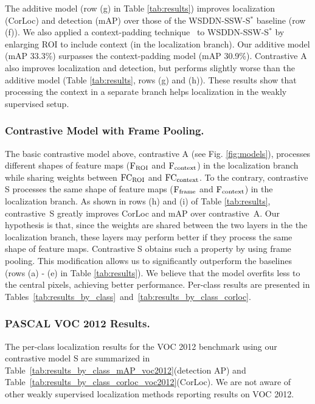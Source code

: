 The additive model (row (g) in Table \ref{tab:results}) improves localization (CorLoc) and detection (mAP)  over those of  the WSDDN-SSW-S$^*$ baseline (row (f)). We also applied a context-padding technique~\cite{Girshick:2016ig} to WSDDN-SSW-S$^*$ by enlarging ROI to include context (in the localization branch). Our additive model (mAP 33.3\%) surpasses the context-padding model (mAP 30.9\%).
Contrastive A also improves localization and detection, but performs slightly worse than the additive model (Table \ref{tab:results}, rows (g) and (h)). 
These results show that processing the context in a separate branch helps 
localization in the weakly supervised setup.


\subsubsection{Contrastive Model with Frame Pooling.}

The basic contrastive model above, contrastive A (see Fig. \ref{fig:models}), processes different shapes of feature maps (${\rm F_{ROI}}$ and ${\rm F_{context}}$) in the localization branch while sharing weights between ${\rm FC_{ROI}}$ and ${\rm FC_{context}}$. To the contrary, contrastive S processes the same shape of feature maps (${\rm F_{frame}}$ and ${\rm F_{context}}$) in the localization branch. As shown in rows (h) and (i) of Table \ref{tab:results}, contrastive~S greatly improves CorLoc and mAP over contrastive~A. Our hypothesis is that, since the weights are shared between the two layers in the the localization
branch, these layers may perform better if they process the same shape of feature maps. Contrastive S obtains such a property by using frame pooling.  
This modification allows us to significantly outperform the baselines (rows (a) - (e) in Table \ref{tab:results}). 
We believe that the model overfits less to the central pixels, achieving better performance.
Per-class results are presented in Tables~\ref{tab:results_by_class}~and~\ref{tab:results_by_class_corloc}.





\subsubsection{PASCAL VOC 2012 Results.}
The per-class localization results for the VOC 2012 benchmark using our contrastive model S are summarized in Table~\ref{tab:results_by_class_mAP_voc2012}(detection AP) and Table~\ref{tab:results_by_class_corloc_voc2012}(CorLoc).
We are not aware of other weakly supervised localization methods reporting results on VOC 2012. %

